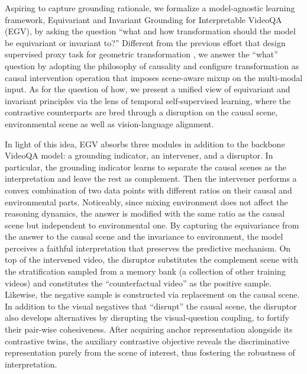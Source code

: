 Aspiring to capture grounding rationale, we formalize a model-agnostic learning framework, Equivariant and Invariant Grounding for Interpretable VideoQA (EGV), 
%
by asking the question ``what and how transformation should the model be equivariant or invariant to?'' 
%
Different from the previous effort that design supervised proxy task for geometric transformation \cite{DBLP:conf/iccv/ChengSM21}, 
we answer the ``what'' question by adopting the philosophy of causality \cite{pearl2009causal} and configure transformation as causal intervention operation that imposes scene-aware mixup \cite{DBLP:conf/iclr/ZhangCDL18} on the multi-modal input.
%
As for the question of how, we present a unified view of equivariant and invariant principles via the lens of temporal self-supervised learning, where the contrastive counterparts are bred through a disruption on the causal scene, environmental scene as well as vision-language alignment.


In light of this idea, EGV absorbs three modules in addition to the backbone VideoQA model: a grounding indicator, an intervener, and a disruptor. 
%
In particular, the grounding indicator learns to separate the causal scenes as the interpretation and leave the rest as complement. Then the intervener performs a convex combination of two data points with different ratios on their causal and environmental parts. 
%
Noticeably, since mixing environment does not affect the reasoning dynamics, the answer is modified with the same ratio as the causal scene but independent to environmental one. 
%
By capturing the equivariance from the answer to the causal scene and the invariance to environment, the model perceives a faithful interpretation that preserves the predictive mechanism.
%
On top of the intervened video, the disruptor substitutes the complement scene with the stratification sampled from a memory bank (a collection of other training videos) and constitutes the “counterfactual video” as the positive sample.
Likewise, the negative sample is constructed via replacement on the causal scene. 
%
In addition to the visual negatives that ``disrupt'' the causal scene, the disruptor also develops alternatives by disrupting the visual-question coupling, to fortify their pair-wise cohesiveness.
% 
After acquiring anchor representation alongside its contrastive twins, the auxiliary contrastive objective reveals the discriminative representation purely from the scene of interest, thus fostering the robustness of interpretation.

